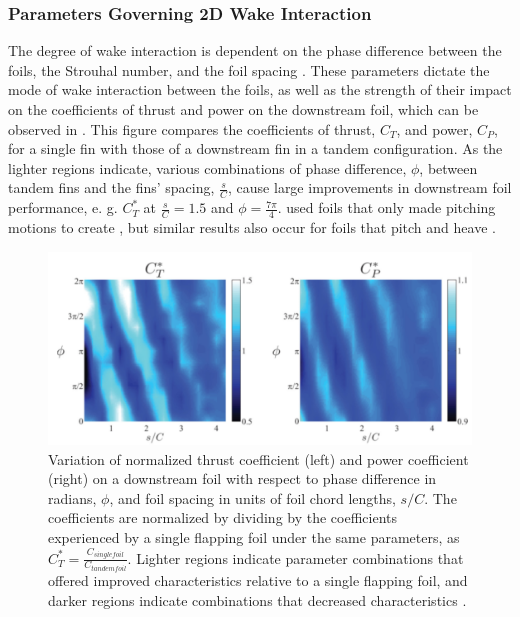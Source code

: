 \subsubsection{Parameters Governing 2D Wake Interaction} \label{Parameters Governing 2D Wake Interaction}

    The degree of wake interaction is dependent on the phase difference between the foils, the Strouhal number, and the foil spacing \citep{Boschitsch2014, Muscutt2017}. These parameters dictate the mode of wake interaction between the foils, as well as the strength of their impact on the coefficients of thrust and power on the downstream foil, which can be observed in . This figure compares the coefficients of thrust, \(C_T\), and power, \(C_P\), for a single fin with those of a downstream fin in a tandem configuration. As the lighter regions indicate, various combinations of phase difference, $\phi$, between tandem fins and the fins' spacing, \(\frac{s}{C}\), cause large improvements in downstream foil performance, e. g. $C_T^*$ at $\frac{s}{C}=1.5$ and $\phi=\frac{7\pi}{4}$. \citep{Boschitsch2014} used foils that only made pitching motions to create , but similar results also occur for foils that pitch and heave \citep{Gopalkrishnan1994, Muscutt2017}.

\begin{figure}
\begin{center}
\includegraphics[width=0.8\columnwidth]{figures/Bos Results.png}
\end{center}
\caption{Variation of normalized thrust coefficient (left) and power coefficient (right) on a downstream foil with respect to phase difference in radians, \(\phi\), and foil spacing in units of foil chord lengths, \(s/C\). The coefficients are normalized by dividing by the coefficients experienced by a single flapping foil under the same parameters, as \(C_T^*=\frac{C_{single foil}}{C_{tandem foil}}\). Lighter regions indicate parameter combinations that offered improved characteristics relative to a single flapping foil, and darker regions indicate combinations that decreased characteristics \citep{Boschitsch2014}.}
\label{fig:PW:Thrust vs Phase}
\end{figure}

